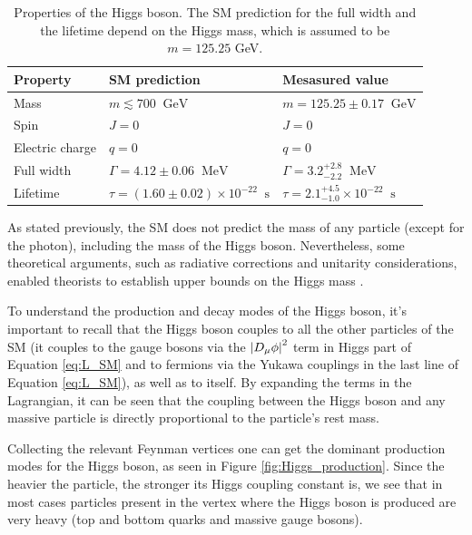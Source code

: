 \begin{table}[ht]
    \centering
    \begin{tabular}{|l|l|l|}
        \hline
        \cellcolor{lightgray}Property & \cellcolor{lightgray}SM prediction & \cellcolor{lightgray}Mesasured value \\ \hline
        Mass                & $m \lesssim 700 \;\; \text{GeV}$ & $m = 125.25 \pm 0.17 \;\; \text{GeV}$             \\
        Spin                &  $J=0$ & $J=0$                                             \\
        Electric charge     & $q=0$  & $q=0$                                             \\
        Full width          & $\Gamma = 4.12 \pm 0.06 \;\;  \text{MeV}$  & $\Gamma = 3.2^{+2.8}_{-2.2} \;\;  \text{MeV}$     \\
        Lifetime            & $\tau = (1.60 \pm 0.02) \times 10^{-22} \;\;  \text{s}$  & $\tau = 2.1^{+4.5}_{-1.0} \times 10^{-22} \;\;  \text{s}$   \\ \hline
    \end{tabular}
    \caption{Properties of the Higgs boson. The SM prediction for the full width and the lifetime depend on the Higgs mass, which is assumed to be $m = 125.25$ GeV.}
    \label{tab:higgs_properties}
\end{table}

As stated previously, the SM does not predict the mass of any particle (except for the photon), including the mass of the Higgs boson. Nevertheless, some theoretical arguments, such as radiative corrections and unitarity considerations, enabled theorists to establish upper bounds on the Higgs mass \cite{Djouadi:2005gi}.

To understand the production and decay modes of the Higgs boson, it's important to recall that the Higgs boson couples to all the other particles of the SM (it couples to the gauge bosons via the $\left\lvert D_{\mu}\phi\right\rvert^2$ term in Higgs part of Equation \eqref{eq:L_SM} and to fermions via the Yukawa couplings in the last line of Equation \eqref{eq:L_SM}), as well as to itself. By expanding the terms in the Lagrangian, it can be seen that the coupling between the Higgs boson and any massive particle is directly proportional to the particle's rest mass.

Collecting the relevant Feynman vertices one can get the dominant production modes for the Higgs boson, as seen in Figure \ref{fig:Higgs_production}. Since the heavier the particle, the stronger its Higgs coupling constant is, we see that in most cases particles present in the vertex where the Higgs boson is produced are very heavy (top and bottom quarks and massive gauge bosons).

